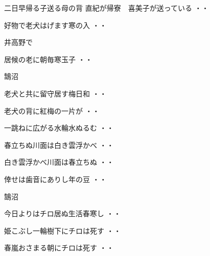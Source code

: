 \begin{shiika}二日早帰る子送る母の背
\qquad\qquad\qquad \qquad 直紀が帰寮　喜美子が送っている
\hfill{・・}\end{shiika}
\begin{shiika}好物で老犬はげます寒の入
\hfill{・・}\end{shiika}
\vspace{0.6cm}
井高野で
\begin{shiika}居候の老に朝毎寒玉子
\hfill{・・}\end{shiika}
\vspace{0.6cm}
鵠沼
\begin{shiika}老犬と共に留守居す梅日和
\hfill{・・}\end{shiika}
\begin{shiika}老犬の背に紅梅の一片が
\hfill{・・}\end{shiika}
\begin{shiika}一跳ねに広がる水輪水ぬるむ
\hfill{・・}\end{shiika}
\begin{shiika}春立ちぬ川面は白き雲浮かべ
\hfill{・・}\end{shiika}
\vspace{0.6cm}
\begin{shiika}白き雲浮かべ川面は春立ちぬ
\hfill{・・}\end{shiika}
\begin{shiika}倖せは歯音にありし年の豆
\hfill{・・}\end{shiika}
\vspace{0.6cm}
鵠沼
\begin{shiika}今日よりはチロ居ぬ生活春寒し
\hfill{・・}\end{shiika}
\vspace{0.6cm}
\begin{shiika}姫こぶし一輪樹下にチロは死す
\hfill{・・}\end{shiika}
\vspace{0.6cm}
\begin{shiika}春嵐おさまる朝にチロは死す
\hfill{・・}\end{shiika}
\vspace{0.6cm}
